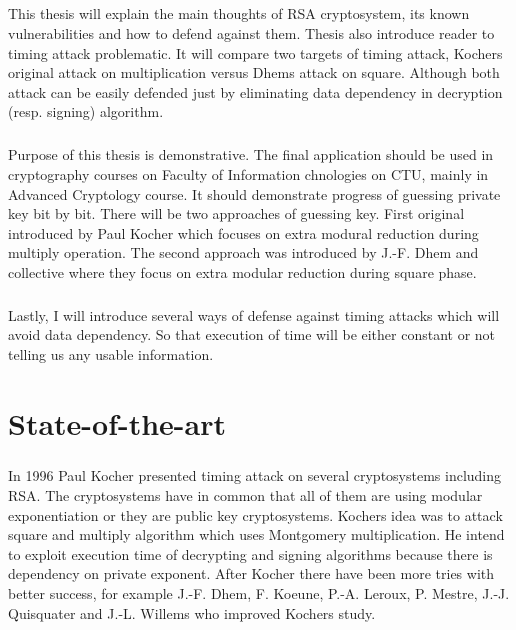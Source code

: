 \documentclass[thesis=B,english]{FITthesis}[2012/10/20]
\begin{document}
\paragraph*{}
{This thesis will explain the main thoughts of RSA cryptosystem, its known vulnerabilities and how to defend against them. Thesis also introduce reader to timing attack problematic.
It will compare two targets of timing attack, Kochers original attack on multiplication versus Dhems attack on square. Although both attack can be easily defended just by eliminating
data dependency in decryption (resp. signing) algorithm.

\paragraph*{}
{
Purpose of this thesis is demonstrative. The final application should be used in cryptography courses on Faculty of Information chnologies on CTU, mainly in Advanced Cryptology course. It should demonstrate progress of guessing private key bit by bit. There will be two approaches of guessing key. First original introduced by Paul Kocher which focuses on extra modural reduction during multiply operation\cite{Kocher1996}. The second approach was introduced by J.-F. Dhem and collective where they focus on extra modular reduction during square phase\cite{Dhem}.
}

\paragraph*{}{
Lastly, I will introduce several ways of defense against timing attacks which will avoid data dependency. So that execution of time will be either constant or not telling us any usable information.
}



\pagestyle{ruled}
\chapter{State-of-the-art}
\paragraph*{}{
In 1996 Paul Kocher presented timing attack on several cryptosystems including RSA\cite{Kocher1996}. The cryptosystems have in common that all of them are using modular exponentiation or they are public key cryptosystems. Kochers idea was to attack square and multiply algorithm which uses Montgomery multiplication. He intend to exploit execution time of decrypting and signing algorithms because there is dependency on private exponent. After Kocher there have been more tries with better success, for example J.-F. Dhem, F. Koeune, P.-A. Leroux, P. Mestre, J.-J. Quisquater and J.-L. Willems who improved Kochers study.\cite{Dhem}}


}
\end{document}
